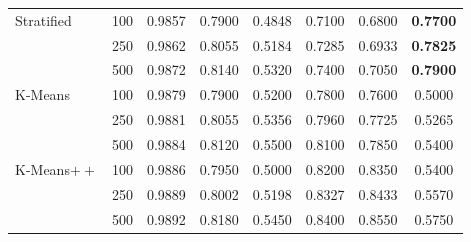 \documentclass[preprint,12pt]{elsarticle}
\begin{document}
\begin{table}[!t]
{\begin{tabular}{ll|cccccc}
Stratified                & 100      & \multicolumn{1}{c|}{0.9857}          & \multicolumn{1}{c|}{0.7900}          & \multicolumn{1}{c|}{0.4848}          & \multicolumn{1}{c|}{0.7100}          & \multicolumn{1}{c|}{0.6800}          & \textbf{0.7700} \\
                          & 250      & \multicolumn{1}{c|}{0.9862}          & \multicolumn{1}{c|}{0.8055}          & \multicolumn{1}{c|}{0.5184}          & \multicolumn{1}{c|}{0.7285}          & \multicolumn{1}{c|}{0.6933}          & \textbf{0.7825} \\
                          & 500      & \multicolumn{1}{c|}{0.9872}          & \multicolumn{1}{c|}{0.8140}          & \multicolumn{1}{c|}{0.5320}          & \multicolumn{1}{c|}{0.7400}          & \multicolumn{1}{c|}{0.7050}          & \textbf{0.7900} \\ \hline
K-Means                   & 100      & \multicolumn{1}{c|}{0.9879}          & \multicolumn{1}{c|}{0.7900}          & \multicolumn{1}{c|}{0.5200}          & \multicolumn{1}{c|}{0.7800}          & \multicolumn{1}{c|}{0.7600}          & 0.5000          \\
                          & 250      & \multicolumn{1}{c|}{0.9881}          & \multicolumn{1}{c|}{0.8055}          & \multicolumn{1}{c|}{0.5356}          & \multicolumn{1}{c|}{0.7960}          & \multicolumn{1}{c|}{0.7725}          & 0.5265          \\
                          & 500      & \multicolumn{1}{c|}{0.9884}          & \multicolumn{1}{c|}{0.8120}          & \multicolumn{1}{c|}{0.5500}          & \multicolumn{1}{c|}{0.8100}          & \multicolumn{1}{c|}{0.7850}          & 0.5400          \\ \hline
K-Means$++$               & 100      & \multicolumn{1}{c|}{0.9886}          & \multicolumn{1}{c|}{0.7950}          & \multicolumn{1}{c|}{0.5000}          & \multicolumn{1}{c|}{0.8200}          & \multicolumn{1}{c|}{0.8350}          & 0.5400          \\
                          & 250      & \multicolumn{1}{c|}{0.9889}          & \multicolumn{1}{c|}{0.8002}          & \multicolumn{1}{c|}{0.5198}          & \multicolumn{1}{c|}{0.8327}          & \multicolumn{1}{c|}{0.8433}          & 0.5570          \\
                          & 500      & \multicolumn{1}{c|}{0.9892}          & \multicolumn{1}{c|}{0.8180}          & \multicolumn{1}{c|}{0.5450}          & \multicolumn{1}{c|}{0.8400}          & \multicolumn{1}{c|}{0.8550}          & 0.5750          \\ \hline

\end{tabular}}
\end{table}
\end{document}
